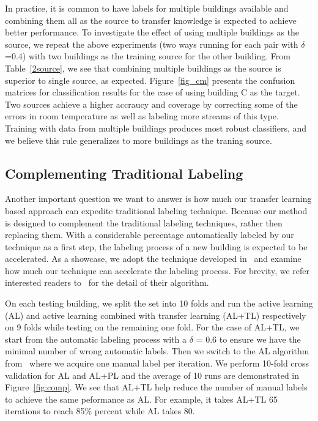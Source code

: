 In practice, it is common to have labels for multiple buildings available and combining them all as the source to transfer knowledge is expected to achieve better performance.
To investigate the effect of using multiple buildings as the source, we repeat the above experiments (two ways running for each pair with $\delta$=0.4) with two buildings as the training source for the other building. 
From Table~\ref{2source}, we see that combining multiple buildings as the source is superior to single source, as expected.
Figure~\ref{fig_cm} presents the confusion matrices for classification results for the case of using building C as the target.
Two sources achieve a higher accraucy and coverage by correcting some of the errors in room temperature as well as labeling more streams of this type.
Training with data from multiple buildings produces most robust classifiers, and we believe this rule generalizes to more buildings as the traning source.


\subsection{Complementing Traditional Labeling}
Another important question we want to answer is how much our transfer learning based approach can expedite traditional labeling technique. 
Because our method is designed to complement the traditional labeling techniques, rather then replacing them.
With a considerable percentage automatically labeled by our technique as a first step, the labeling process of a new building is expected to be accelerated.
As a showcase, we adopt the technique developed in~\cite{cikm} and examine how much our technique can accelerate the labeling process.
For brevity, we refer interested readers to~\cite{cikm} for the detail of their algorithm.

On each testing building, we split the set into 10 folds and run the active learning (AL) and active learning combined with transfer learning (AL+TL) respectively on 9 folds while testing on the remaining one fold.
For the case of AL+TL, we start from the automatic labeling process with a $\delta$ = 0.6 to ensure we have the minimal number of wrong automatic labels. Then we switch to the AL algorithm from~\cite{cikm} where we acquire one manual label per iteration.
We perform 10-fold cross validation for AL and AL+PL and the average of 10 runs are demonstrated in Figure~\ref{fig:comp}. We see that AL+TL help reduce the number of manual labels to achieve the same peformance as AL.
For example, it takes AL+TL 65 iterations to reach 85\% percent while AL takes 80.


